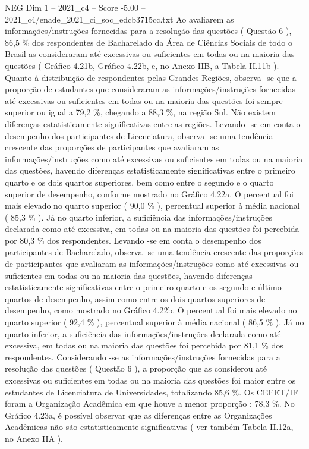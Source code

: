 \begin{textsample}{NEG Dim 1 – 2021\_c4 – Score -5.00 – 2021\_c4/enade\_2021\_ci\_soc\_edcb3715cc.txt}
Ao avaliarem as informações/instruções fornecidas para a resolução das questões ( Questão 6 ), 86,5 \% dos respondentes de Bacharelado da Área de Ciências Sociais de todo o Brasil as consideraram até excessivas ou suficientes em todas ou na maioria das questões ( Gráfico 4.21b, Gráfico 4.22b, e, no Anexo IIB, a Tabela II.11b ).
Quanto à distribuição de respondentes pelas Grandes Regiões, observa -se que a proporção de estudantes que consideraram as informações/instruções fornecidas até excessivas ou suficientes em todas ou na maioria das questões foi sempre superior ou igual a 79,2 \%, chegando a 88,3 \%, na região Sul.
Não existem diferenças estatisticamente significativas entre as regiões.
Levando -se em conta o desempenho dos participantes de Licenciatura, observa -se uma tendência crescente das proporções de participantes que avaliaram as informações/instruções como até excessivas ou suficientes em todas ou na maioria das questões, havendo diferenças estatisticamente significativas entre o primeiro quarto e os dois quartos superiores, bem como entre o segundo e o quarto superior de desempenho, conforme mostrado no Gráfico 4.22a.
O percentual foi mais elevado no quarto superior ( 90,0 \% ), percentual superior à média nacional ( 85,3 \% ).
Já no quarto inferior, a suficiência das informações/instruções declarada como até excessiva, em todas ou na maioria das questões foi percebida por 80,3 \% dos respondentes.
Levando -se em conta o desempenho dos participantes de Bacharelado, observa -se uma tendência crescente das proporções de participantes que avaliaram as informações/instruções como até excessivas ou suficientes em todas ou na maioria das questões, havendo diferenças estatisticamente significativas entre o primeiro quarto e os segundo e último quartos de desempenho, assim como entre os dois quartos superiores de desempenho, como mostrado no Gráfico 4.22b.
O percentual foi mais elevado no quarto superior ( 92,4 \% ), percentual superior à média nacional ( 86,5 \% ).
Já no quarto inferior, a suficiência das informações/instruções declarada como até excessiva, em todas ou na maioria das questões foi percebida por 81,1 \% dos respondentes.
Considerando -se as informações/instruções fornecidas para a resolução das questões ( Questão 6 ), a proporção que as considerou até excessivas ou suficientes em todas ou na maioria das questões foi maior entre os estudantes de Licenciatura de Universidades, totalizando 85,6 \%.
Os CEFET/IF foram a Organização Acadêmica em que houve a menor proporção : 78,3 \%.
No Gráfico 4.23a, é possível observar que as diferenças entre as Organizações Acadêmicas não são estatisticamente significativas ( ver também Tabela II.12a, no Anexo IIA ).

\end{textsample}
